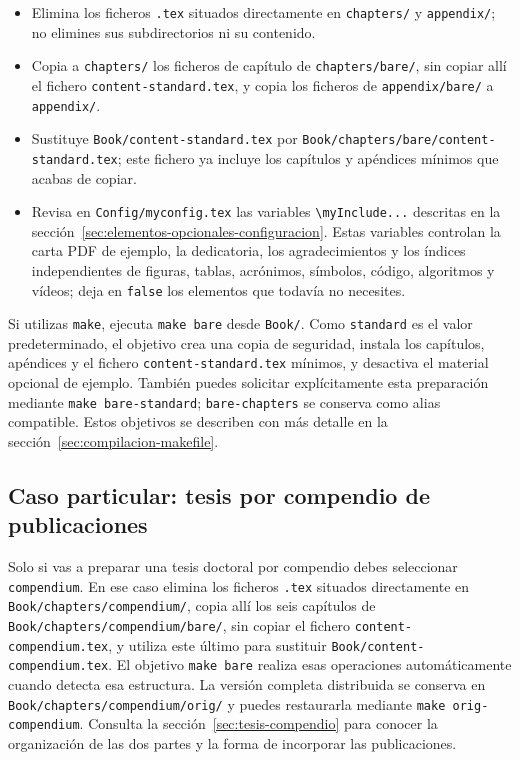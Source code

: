 \begin{itemize}
  \item Elimina los ficheros \texttt{.tex} situados directamente en \texttt{chapters/} y \texttt{appendix/}; no elimines sus subdirectorios ni su contenido.
  \item Copia a \texttt{chapters/} los ficheros de capítulo de \texttt{chapters/bare/}, sin copiar allí el fichero \texttt{content-standard.tex}, y copia los ficheros de \texttt{appendix/bare/} a \texttt{appendix/}.
  \item Sustituye \texttt{Book/content-standard.tex} por \texttt{Book/chapters/bare/content-standard.tex}; este fichero ya incluye los capítulos y apéndices mínimos que acabas de copiar.
  \item Revisa en \texttt{Config/myconfig.tex} las variables \texttt{\textbackslash{}myInclude...} descritas en la sección~\ref{sec:elementos-opcionales-configuracion}. Estas variables controlan la carta PDF de ejemplo, la dedicatoria, los agradecimientos y los índices independientes de figuras, tablas, acrónimos, símbolos, código, algoritmos y vídeos; deja en \texttt{false} los elementos que todavía no necesites.
\end{itemize}

Si utilizas \texttt{make}, ejecuta \texttt{make bare} desde \texttt{Book/}. Como \texttt{standard} es el valor predeterminado, el objetivo crea una copia de seguridad, instala los capítulos, apéndices y el fichero \texttt{content-standard.tex} mínimos, y desactiva el material opcional de ejemplo. También puedes solicitar explícitamente esta preparación mediante \texttt{make bare-standard}; \texttt{bare-chapters} se conserva como alias compatible. Estos objetivos se describen con más detalle en la sección~\ref{sec:compilacion-makefile}.

\subsection{Caso particular: tesis por compendio de publicaciones}

Solo si vas a preparar una tesis doctoral por compendio debes seleccionar \texttt{compendium}. En ese caso elimina los ficheros \texttt{.tex} situados directamente en \texttt{Book/chapters/compendium/}, copia allí los seis capítulos de \texttt{Book/chapters/compendium/bare/}, sin copiar el fichero \texttt{content-compendium.tex}, y utiliza este último para sustituir \texttt{Book/content-compendium.tex}. El objetivo \texttt{make bare} realiza esas operaciones automáticamente cuando detecta esa estructura. La versión completa distribuida se conserva en \texttt{Book/chapters/compendium/orig/} y puedes restaurarla mediante \texttt{make orig-compendium}. Consulta la sección~\ref{sec:tesis-compendio} para conocer la organización de las dos partes y la forma de incorporar las publicaciones.

